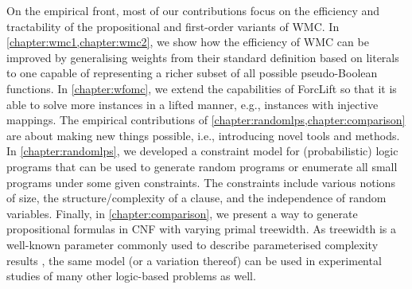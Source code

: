 On the empirical front, most of our contributions focus on the efficiency and
tractability of the propositional and first-order variants of WMC\@. In
\cref{chapter:wmc1,chapter:wmc2}, we show how the efficiency of WMC can be
improved by generalising weights from their standard definition based on
literals to one capable of representing a richer subset of all possible
pseudo-Boolean functions. In \cref{chapter:wfomc}, we extend the capabilities of
ForcLift \citep{DBLP:conf/ijcai/BroeckTMDR11} so that it is able to solve more
instances in a lifted manner, e.g., instances with injective mappings. The
empirical contributions of \cref{chapter:randomlps,chapter:comparison} are about
making new things possible, i.e., introducing novel tools and methods. In
\cref{chapter:randomlps}, we developed a constraint model for (probabilistic)
logic programs that can be used to generate random programs or enumerate all
small programs under some given constraints. The constraints include various
notions of size, the structure/complexity of a clause, and the independence of
random variables. Finally, in \cref{chapter:comparison}, we present a way to
generate propositional formulas in CNF with varying primal treewidth. As
treewidth is a well-known parameter commonly used to describe parameterised
complexity results \citep{DBLP:series/txcs/DowneyF13}, the same model (or a
variation thereof) can be used in experimental studies of many other logic-based
problems as well.


